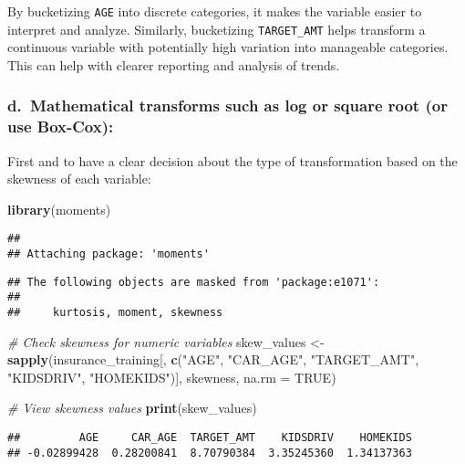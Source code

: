 \documentclass[
]{article}
\newenvironment{Shaded}{\begin{snugshade}}{\end{snugshade}}
\newcommand{\AttributeTok}[1]{\textcolor[rgb]{0.13,0.29,0.53}{#1}}
\newcommand{\CommentTok}[1]{\textcolor[rgb]{0.56,0.35,0.01}{\textit{#1}}}
\newcommand{\ConstantTok}[1]{\textcolor[rgb]{0.56,0.35,0.01}{#1}}
\newcommand{\FunctionTok}[1]{\textcolor[rgb]{0.13,0.29,0.53}{\textbf{#1}}}
\newcommand{\NormalTok}[1]{#1}
\newcommand{\OtherTok}[1]{\textcolor[rgb]{0.56,0.35,0.01}{#1}}
\newcommand{\StringTok}[1]{\textcolor[rgb]{0.31,0.60,0.02}{#1}}
\begin{document}
By bucketizing \texttt{AGE} into discrete categories, it makes the
variable easier to interpret and analyze. Similarly, bucketizing
\texttt{TARGET\_AMT} helps transform a continuous variable with
potentially high variation into manageable categories. This can help
with clearer reporting and analysis of trends.

\subsubsection{d.~Mathematical transforms such as log or square root (or
use
Box-Cox):}\label{d.-mathematical-transforms-such-as-log-or-square-root-or-use-box-cox}

First and to have a clear decision about the type of transformation
based on the skewness of each variable:

\begin{Shaded}
\begin{Highlighting}[]
\FunctionTok{library}\NormalTok{(moments)}
\end{Highlighting}
\end{Shaded}

\begin{verbatim}
## 
## Attaching package: 'moments'
\end{verbatim}

\begin{verbatim}
## The following objects are masked from 'package:e1071':
## 
##     kurtosis, moment, skewness
\end{verbatim}

\begin{Shaded}
\begin{Highlighting}[]
\CommentTok{\# Check skewness for numeric variables}
\NormalTok{skew\_values }\OtherTok{\textless{}{-}} \FunctionTok{sapply}\NormalTok{(insurance\_training[, }\FunctionTok{c}\NormalTok{(}\StringTok{"AGE"}\NormalTok{, }\StringTok{"CAR\_AGE"}\NormalTok{, }\StringTok{"TARGET\_AMT"}\NormalTok{, }\StringTok{"KIDSDRIV"}\NormalTok{, }\StringTok{"HOMEKIDS"}\NormalTok{)], skewness, }\AttributeTok{na.rm =} \ConstantTok{TRUE}\NormalTok{)}

\CommentTok{\# View skewness values}
\FunctionTok{print}\NormalTok{(skew\_values)}
\end{Highlighting}
\end{Shaded}

\begin{verbatim}
##         AGE     CAR_AGE  TARGET_AMT    KIDSDRIV    HOMEKIDS 
## -0.02899428  0.28200841  8.70790384  3.35245360  1.34137363
\end{verbatim}
\end{document}
